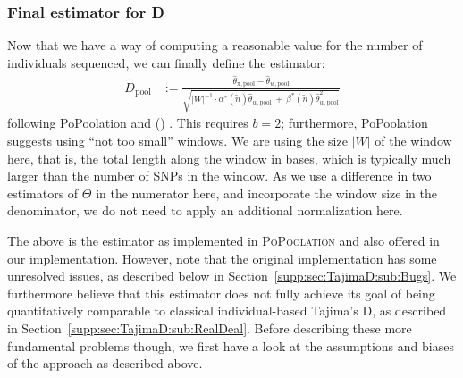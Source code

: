 \documentclass[letterpaper,fontsize=9pt,DIV=12]{scrartcl}
\newcounter{todo}
\newcounter{popoolissue}
\newcommand\todo[1]{}
\newcommand\popoolissue[1]{}
\newcommand\citeay[1]{\citeauthor{#1} (\citeyear{#1}) \cite{#1}}
\newcommand\toolname{\textsc}
\newcommand\secref[1]{Section~\ref{#1}}
\begin{document}
\popoolissue{Lastly, we noted that the computation of $\tilde{n}$ generally results in some non-integer value. However, if we understand the equations for alpha* and beta* correctly, they expect integer values. We did some quick test of this, and it seems that some low non-integer values of pool sizes and coverages can even lead to negative results then. This should not be an issue in practice, but it still seems that something is not quite right here.}

\subsubsection*{Final estimator for D}

Now that we have a way of computing a reasonable value for the number of individuals sequenced,
we can finally define the estimator:
%
\begin{align}
    \tilde{D}_\text{pool} &:=
    \frac{
        \widehat{\theta}_{\pi, \text{pool}} - \widehat{\theta}_{w, \text{pool}}
            }{
        \sqrt{ {|W|}^{-1} \cdot \alpha^*(\tilde{n}) \widehat{\theta}_{w, \text{pool}} ~+~ \beta^*(\tilde{n}) \widehat{\theta}_{w, \text{pool}}^2 }
    }
\end{align}
%
following PoPoolation and \citeay{Achaz2008}.
This requires $b=2$; furthermore, PoPoolation suggests using ``not too small'' windows.
We are using the size $|W|$ of the window here, that is, the total length along the window in bases, which is typically much larger than the number of SNPs in the window. As we use a difference in two estimators of $\Theta$ in the numerator here, and incorporate the window size in the denominator, we do not need to apply an additional normalization here.

\todo{UNRESOLVED ISSUE: That is what i get from their code. Is that the correct term to use here? should it be the number of SNPs in the window instead?  JPS: I have no idea.  I would need to go through the Achaz paper in some detail to figure it out.  My guess is number of SNPs is right.}

The above is the estimator as implemented in \toolname{PoPoolation} and also offered in our implementation. However, note that the original implementation has some unresolved issues, as described below in \secref{supp:sec:TajimaD:sub:Bugs}. We furthermore believe that this estimator does not fully achieve its goal of being quantitatively comparable to classical individual-based Tajima's D, as described in \secref{supp:sec:TajimaD:sub:RealDeal}.
Before describing these more fundamental problems though, we first have a look at the assumptions and biases of the approach as described above.
\end{document}

